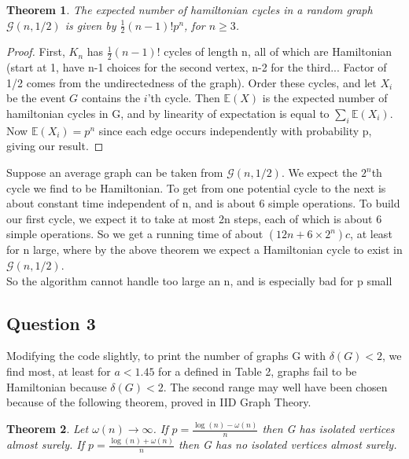 \documentclass[10pt,a4paper]{report}
\newtheorem*{theorem}{Theorem}
\begin{document}
\begin{theorem} 
The expected number of hamiltonian cycles in a random graph $\mathcal{G}(n,1/2)$ is given by $\frac{1}{2}(n-1)!p^n$, for $n\geq3$.
\end{theorem}
\begin{proof}
First, $K_n$ has $\frac{1}{2}(n-1)!$ cycles of length n, all of which are Hamiltonian (start at 1, have n-1 choices for the second vertex, n-2 for the third... Factor of 1/2 comes from the undirectedness of the graph). Order these cycles, and let $X_i$ be the event $G$ contains the $i$'th cycle. Then $\mathbb{E}(X)$ is the expected number of hamiltonian cycles in G, and by linearity of expectation is equal to $\sum_i \mathbb{E}(X_i)$. Now $\mathbb{E}(X_i) = p^n$ since each edge occurs independently with probability p, giving our result.
\end{proof}

Suppose an average graph can be taken from $\mathcal{G}(n,1/2)$. We expect the $2^n$th cycle we find to be Hamiltonian. To get from one potential cycle to the next is about constant time independent of n, and is about 6 simple operations. To build our first cycle, we expect it to take at most 2n steps, each of which is about 6 simple operations. So we get a running time of about $(12n+6\times 2^n)c$, at least for n large, where by the above theorem we expect a Hamiltonian cycle to exist in $\mathcal{G}(n,1/2)$.\\

So the algorithm cannot handle too large an n, and is especially bad for p small

\subsection*{Question 3}
Modifying the code slightly, to print the number of graphs G with $\delta(G) < 2$, we find most, at least for $a<1.45$ for a defined in Table 2, graphs fail to be Hamiltonian because  $\delta(G) < 2$. The second range may well have been chosen because of the following theorem, proved in IID Graph Theory.

\begin{theorem}
Let $\omega(n) \rightarrow \infty$.  If $p =\frac{\log(n)-\omega(n)}{n}$ then G has isolated vertices almost surely.  If $p =\frac{\log(n)+\omega(n)}{n}$ then G has no isolated vertices almost surely.
\end{theorem}
\end{document}
